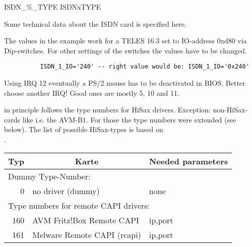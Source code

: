 \begin{description}
 {ISDN\_\%\_TYPE} {ISDNxTYPE}

  Some technical data about the ISDN card is specified here.
  
  The values in the example work for a TELES 16.3 set to IO-address 0xd80 
  via Dip-switches. For other settings of the switches the values have 
  to be changed.

  \begin{example}
  \begin{verbatim}
          ISDN_1_IO='240' -- right value would be: ISDN_1_IO='0x240'
  \end{verbatim}
  \end{example}

  Using IRQ 12 eventually a PS/2 mouse has to be deactivated in 
  BIOS. Better choose another IRQ!
  \glqq{}Good ones\grqq{} are mostly 5, 10 and 11.
  
   in principle follows the type numbers for HiSax 
  drivers. Exception: non-HiSax-cards like i.e. the AVM-B1. For those 
  the type numbers were extended (see below). The list of possible 
  HiSax-types is based on \\
  .

\begin{small}
  \begin{longtable}{|r|p{60mm}|p{62mm}|}
    \hline
    \multicolumn{1}{|c}{\textbf{Typ}} & \multicolumn{1}{|c}{\textbf{Karte}} &
    \multicolumn{1}{|c|}{\textbf{Needed parameters}} \\
    \hline\hline
    \endhead

    \multicolumn{3}{|l|}{Dummy Type-Number:} \\
    \hline
      0 &  no driver (dummy)             & none \\

    \hline\hline
    \multicolumn{3}{|l|}{Type numbers for remote CAPI drivers:} \\
    \hline

    160 & AVM Fritz!Box Remote CAPI   & ip,port \\
    161 & Melware Remote CAPI (rcapi) & ip,port \\


\end{longtable}
\end{small}
\end{description}
